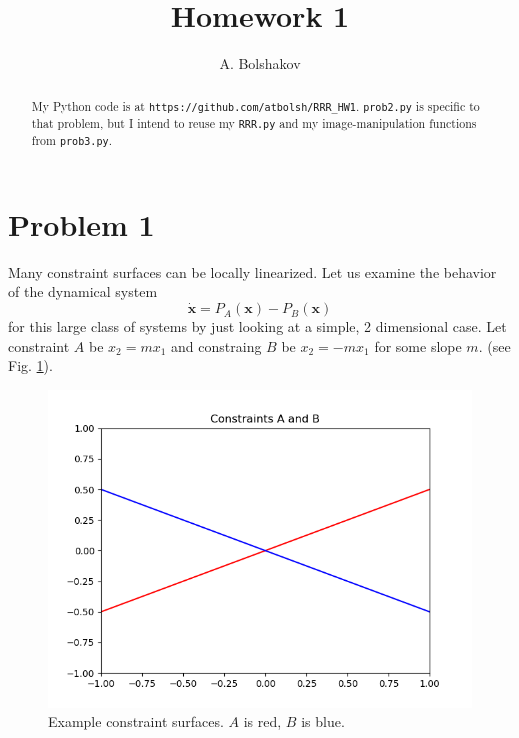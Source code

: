 \documentclass[psamsfonts]{amsart}
\title{Homework 1}
\author{A. Bolshakov}
\theoremstyle{definition}
\theoremstyle{remark}
\numberwithin{equation}{section}
\begin{document}
\maketitle


\begin{abstract}
My Python code is at \texttt{https://github.com/atbolsh/RRR\_HW1}.
\texttt{prob2.py} is specific to that problem, but I intend to reuse my 
\texttt{RRR.py} and my image-manipulation functions from \texttt{prob3.py}.
\end{abstract}

\section{Problem 1}

Many constraint surfaces can be locally linearized. 
Let us examine the behavior of the dynamical system
\[
\dot{\mathbf{x}} = P_A(\mathbf{x}) - P_B(\mathbf{x})
\]
for this large class of systems by just looking at a simple, 2 dimensional case. 
Let constraint $A$ be
$x_2 = mx_1$
and constraing $B$ be 
$x_2 = -mx_1$
for some slope $m$.
(see Fig. \ref{fig1}).




\begin{figure}
\includegraphics[scale=0.5]{../images/Figure_1.png}
\caption{Example constraint surfaces. $A$ is red, $B$ is blue.}
\label{fig1}
\end{figure}
\end{document}
